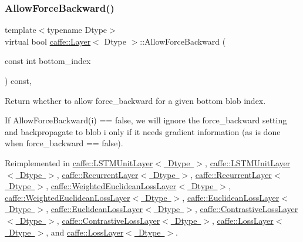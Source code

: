 \subsubsection{\texorpdfstring{Allow\+Force\+Backward()}{AllowForceBackward()}\hspace{0.1cm}{\footnotesize\ttfamily [1/2]}}
{\footnotesize\ttfamily template$<$typename Dtype$>$ \\
virtual bool \mbox{\hyperlink{classcaffe_1_1_layer}{caffe\+::\+Layer}}$<$ Dtype $>$\+::Allow\+Force\+Backward (\begin{DoxyParamCaption}\item[{const int}]{bottom\+\_\+index }\end{DoxyParamCaption}) const\hspace{0.3cm}{\ttfamily [inline]}, {\ttfamily [virtual]}}



Return whether to allow force\+\_\+backward for a given bottom blob index. 

If Allow\+Force\+Backward(i) == false, we will ignore the force\+\_\+backward setting and backpropagate to blob i only if it needs gradient information (as is done when force\+\_\+backward == false). 

Reimplemented in \mbox{\hyperlink{classcaffe_1_1_l_s_t_m_unit_layer_a9c46167bc8b96b28196bc24a5515b531}{caffe\+::\+L\+S\+T\+M\+Unit\+Layer$<$ Dtype $>$}}, \mbox{\hyperlink{classcaffe_1_1_l_s_t_m_unit_layer_a9c46167bc8b96b28196bc24a5515b531}{caffe\+::\+L\+S\+T\+M\+Unit\+Layer$<$ Dtype $>$}}, \mbox{\hyperlink{classcaffe_1_1_recurrent_layer_a8d91610cc8b9615a1db4f07fe5590a37}{caffe\+::\+Recurrent\+Layer$<$ Dtype $>$}}, \mbox{\hyperlink{classcaffe_1_1_recurrent_layer_a8d91610cc8b9615a1db4f07fe5590a37}{caffe\+::\+Recurrent\+Layer$<$ Dtype $>$}}, \mbox{\hyperlink{classcaffe_1_1_weighted_euclidean_loss_layer_a6b996834a2a27bb8d2d9b48873b6cd65}{caffe\+::\+Weighted\+Euclidean\+Loss\+Layer$<$ Dtype $>$}}, \mbox{\hyperlink{classcaffe_1_1_weighted_euclidean_loss_layer_a6b996834a2a27bb8d2d9b48873b6cd65}{caffe\+::\+Weighted\+Euclidean\+Loss\+Layer$<$ Dtype $>$}}, \mbox{\hyperlink{classcaffe_1_1_euclidean_loss_layer_a76dd3fde9f09cb9840f05ee035b5a2c5}{caffe\+::\+Euclidean\+Loss\+Layer$<$ Dtype $>$}}, \mbox{\hyperlink{classcaffe_1_1_euclidean_loss_layer_a76dd3fde9f09cb9840f05ee035b5a2c5}{caffe\+::\+Euclidean\+Loss\+Layer$<$ Dtype $>$}}, \mbox{\hyperlink{classcaffe_1_1_contrastive_loss_layer_af0f16d5119ac6118b670c1966c38fd7d}{caffe\+::\+Contrastive\+Loss\+Layer$<$ Dtype $>$}}, \mbox{\hyperlink{classcaffe_1_1_contrastive_loss_layer_af0f16d5119ac6118b670c1966c38fd7d}{caffe\+::\+Contrastive\+Loss\+Layer$<$ Dtype $>$}}, \mbox{\hyperlink{classcaffe_1_1_loss_layer_a36d35155bfe0de53a79c517f33759612}{caffe\+::\+Loss\+Layer$<$ Dtype $>$}}, and \mbox{\hyperlink{classcaffe_1_1_loss_layer_a36d35155bfe0de53a79c517f33759612}{caffe\+::\+Loss\+Layer$<$ Dtype $>$}}.

